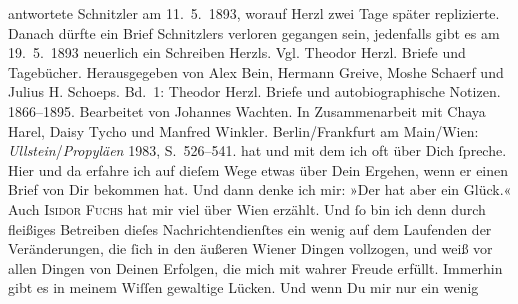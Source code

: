 \begin{ledgroupsized}[t]{13cm}
{{{                  antwortete Schnitzler am
                     11. 5. 1893, worauf Herzl
                  zwei Tage später replizierte. Danach dürfte ein Brief Schnitzlers verloren gegangen sein, jedenfalls gibt es am
                     19. 5. 1893 neuerlich ein Schreiben Herzls. Vgl. Theodor Herzl. Briefe und Tagebücher.
                        Herausgegeben von Alex Bein, Hermann Greive, Moshe Schaerf und Julius H. Schoeps. Bd. 1:
                        Theodor Herzl. Briefe und
                     autobiographische Notizen. 1866–1895. Bearbeitet von Johannes Wachten. In Zusammenarbeit mit Chaya
                     Harel, Daisy Tycho und Manfred Winkler.
                     Berlin/Frankfurt am Main/Wien:
                        \emph{Ullstein}/\emph{Propyläen}{ }1983, S. 526–541. }}}\label{K_L02708-2h} hat und mit dem ich oft über Dich
               ſpreche. Hier und da erfahre ich auf dieſem Wege etwas über Dein Ergehen, wenn er
               einen Brief von Dir bekommen hat. Und dann denke ich mir: »Der hat aber ein Glück.«
               Auch \textsc{Isidor Fuchs} hat mir viel über Wien erzählt. Und ſo  bin ich denn durch fleißiges  Betreiben dieſes Nachrichtendienſtes ein wenig auf
               dem Laufenden der Veränderungen, die ſich in den äußeren Wiener Dingen vollzogen, und weiß vor allen Dingen von Deinen
               Erfolgen, die mich mit wahrer Freude {\pb}erfüllt.
               Immerhin gibt es in meinem Wiſſen gewaltige Lücken. Und wenn Du mir nur ein wenig

\end{ledgroupsized}
